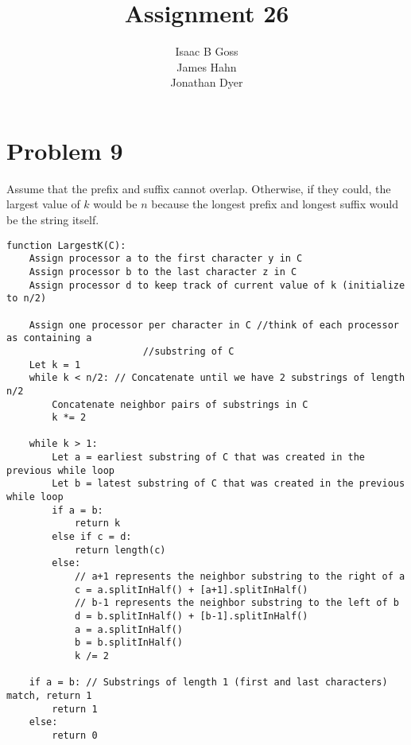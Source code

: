 \documentclass{article}
\author{Isaac B Goss\\ James Hahn\\ Jonathan Dyer}
\title{Assignment 26}
\providecommand{\prob}[1]{\section*{Problem #1}}
\providecommand{\image}[1]{
    \begin{center}
        \includegraphics%
            {#1}
    \end{center}
}
\begin{document}
\maketitle

\prob{9}
Assume that the prefix and suffix cannot overlap.  Otherwise, if they could, the largest value of $k$ would be $n$ because the longest prefix and longest suffix would be the string itself.\\

\begin{lstlisting}
function LargestK(C):
    Assign processor a to the first character y in C
    Assign processor b to the last character z in C
    Assign processor d to keep track of current value of k (initialize to n/2)
    
    Assign one processor per character in C //think of each processor as containing a 
                        //substring of C
    Let k = 1
    while k < n/2: // Concatenate until we have 2 substrings of length n/2
        Concatenate neighbor pairs of substrings in C
        k *= 2
    
    while k > 1:
        Let a = earliest substring of C that was created in the previous while loop
        Let b = latest substring of C that was created in the previous while loop
        if a = b:
            return k
        else if c = d:
            return length(c)
        else:
            // a+1 represents the neighbor substring to the right of a
            c = a.splitInHalf() + [a+1].splitInHalf()
            // b-1 represents the neighbor substring to the left of b
            d = b.splitInHalf() + [b-1].splitInHalf()
            a = a.splitInHalf()
            b = b.splitInHalf()
            k /= 2
            
    if a = b: // Substrings of length 1 (first and last characters) match, return 1
        return 1
    else:
        return 0
\end{lstlisting}

\end{document}
